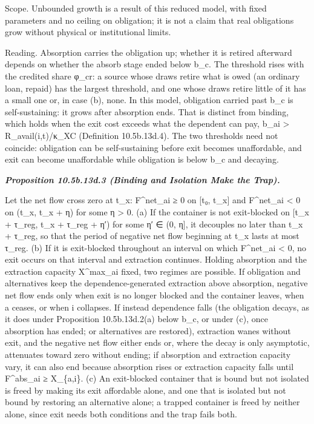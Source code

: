 \documentclass[
]{article}
\begin{document}
Scope. Unbounded growth is a result of this reduced model, with fixed
parameters and no ceiling on obligation; it is not a claim that real
obligations grow without physical or institutional limits.

Reading. Absorption carries the obligation up; whether it is retired
afterward depends on whether the absorb stage ended below b\_c. The
threshold rises with the credited share φ\_cr: a source whose draws
retire what is owed (an ordinary loan, repaid) has the largest
threshold, and one whose draws retire little of it has a small one or,
in case (b), none. In this model, obligation carried past b\_c is
self-sustaining: it grows after absorption ends. That is distinct from
binding, which holds when the exit cost exceeds what the dependent can
pay, b\_ai \textgreater{} R\_avail(i,t)/κ\_XC (Definition 10.5b.13d.4).
The two thresholds need not coincide: obligation can be self-sustaining
before exit becomes unaffordable, and exit can become unaffordable while
obligation is below b\_c and decaying.

\emph{\textbf{Proposition 10.5b.13d.3 (Binding and Isolation Make the
Trap).}}

Let the net flow cross zero at t\_x: F\^{}net\_ai ≥ 0 on {[}t₀, t\_x{]}
and F\^{}net\_ai \textless{} 0 on (t\_x, t\_x + η) for some η
\textgreater{} 0. (a) If the container is not exit-blocked on {[}t\_x +
τ\_reg, t\_x + τ\_reg + η′) for some η′ ∈ (0, η{]}, it decouples no
later than t\_x + τ\_reg, so that the period of negative net flow
beginning at t\_x lasts at most τ\_reg. (b) If it is exit-blocked
throughout an interval on which F\^{}net\_ai \textless{} 0, no exit
occurs on that interval and extraction continues. Holding absorption and
the extraction capacity X\^{}max\_ai fixed, two regimes are possible. If
obligation and alternatives keep the dependence-generated extraction
above absorption, negative net flow ends only when exit is no longer
blocked and the container leaves, when a ceases, or when i collapses. If
instead dependence falls (the obligation decays, as it does under
Proposition 10.5b.13d.2(a) below b\_c, or under (c), once absorption has
ended; or alternatives are restored), extraction wanes without exit, and
the negative net flow either ends or, where the decay is only
asymptotic, attenuates toward zero without ending; if absorption and
extraction capacity vary, it can also end because absorption rises or
extraction capacity falls until F\^{}abs\_ai ≥ X\_\{a,i\}. (c) An
exit-blocked container that is bound but not isolated is freed by making
its exit affordable alone, and one that is isolated but not bound by
restoring an alternative alone; a trapped container is freed by neither
alone, since exit needs both conditions and the trap fails both.
\end{document}
